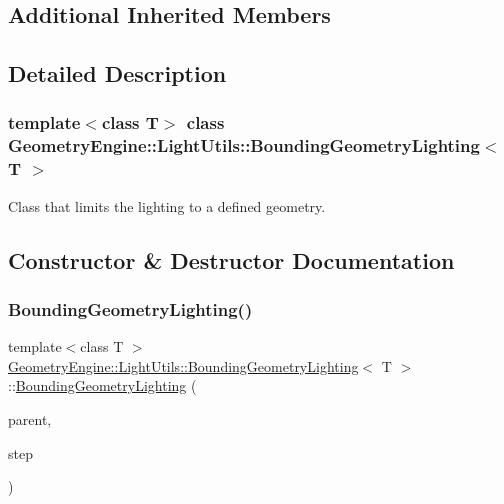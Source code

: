 \subsection*{Additional Inherited Members}


\subsection{Detailed Description}
\subsubsection*{template$<$class T$>$\newline
class Geometry\+Engine\+::\+Light\+Utils\+::\+Bounding\+Geometry\+Lighting$<$ T $>$}

Class that limits the lighting to a defined geometry. 

\subsection{Constructor \& Destructor Documentation}
\mbox{\label{class_geometry_engine_1_1_light_utils_1_1_bounding_geometry_lighting_a9b7363be5820b70f03828a4704fe448d}} 
\subsubsection{\texorpdfstring{BoundingGeometryLighting()}{BoundingGeometryLighting()}\hspace{0.1cm}{\footnotesize\ttfamily [1/2]}}
{\footnotesize\ttfamily template$<$class T $>$ \\
\mbox{\hyperlink{class_geometry_engine_1_1_light_utils_1_1_bounding_geometry_lighting}{Geometry\+Engine\+::\+Light\+Utils\+::\+Bounding\+Geometry\+Lighting}}$<$ T $>$\+::\mbox{\hyperlink{class_geometry_engine_1_1_light_utils_1_1_bounding_geometry_lighting}{Bounding\+Geometry\+Lighting}} (\begin{DoxyParamCaption}\item[{\mbox{\hyperlink{class_geometry_engine_1_1_light_utils_1_1_light_component_manager}{Light\+Component\+Manager}} $\ast$}]{parent,  }\item[{\mbox{\hyperlink{namespace_geometry_engine_1_1_light_utils_ac3078de660742daceaa06bd9bc61d24a}{Light\+Render}}}]{step }\end{DoxyParamCaption})\hspace{0.3cm}{\ttfamily [inline]}}

